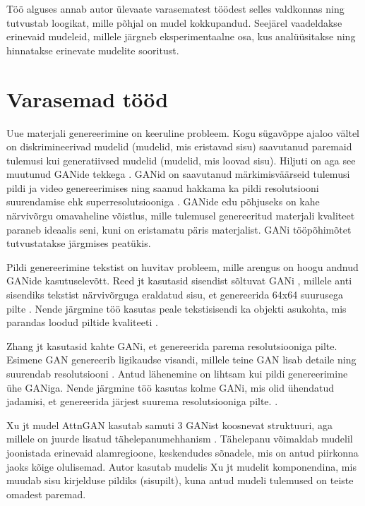 \documentclass{vilgym}
\begin{document}
	Töö alguses annab autor ülevaate varasematest töödest selles valdkonnas ning tutvustab loogikat, mille põhjal on mudel kokkupandud. Seejärel vaadeldakse erinevaid mudeleid, millele järgneb eksperimentaalne osa, kus analüüsitakse ning hinnatakse erinevate mudelite sooritust. 
	
	\section{Varasemad tööd}

	Uue materjali genereerimine on keeruline probleem. Kogu sügavõppe ajaloo vältel on diskrimineerivad mudelid (mudelid, mis eristavad sisu) saavutanud paremaid tulemusi kui generatiivsed mudelid (mudelid, mis loovad sisu). Hiljuti on aga see muutunud GANide tekkega \parencite{gan}. GANid on saavutanud märkimisväärseid tulemusi pildi \parencite{biggan} ja video genereerimises \parencite{dvdgan} ning saanud hakkama ka pildi resolutsiooni suurendamise ehk superresolutsiooniga \parencite{srgan}. GANide edu põhjuseks on kahe närvivõrgu omavaheline võistlus, mille tulemusel genereeritud materjali kvaliteet paraneb ideaalis seni, kuni on eristamatu päris materjalist. GANi tööpõhimõtet tutvustatakse järgmises peatükis.

	Pildi genereerimine tekstist on huvitav probleem, mille arengus on hoogu andnud GANide kasutuselevõtt. Reed jt kasutasid sisendist sõltuvat GANi , millele anti sisendiks tekstist närvivõrguga eraldatud sisu, et genereerida 64x64 suurusega pilte \parencite{reed}. Nende järgmine töö kasutas peale tekstisisendi ka objekti asukohta, mis parandas loodud piltide kvaliteeti \parencite{reed2}. 

	Zhang jt kasutasid kahte GANi, et genereerida parema resolutsiooniga pilte. Esimene GAN genereerib ligikaudse visandi, millele teine GAN lisab detaile ning suurendab resolutsiooni \parencite{stackgan}. Antud lähenemine on lihtsam kui pildi genereerimine ühe GANiga. Nende järgmine töö kasutas kolme GANi, mis olid ühendatud jadamisi, et genereerida järjest suurema resolutsiooniga pilte. \parencite{stackgan2}.

	Xu jt mudel AttnGAN kasutab samuti 3 GANist koosnevat struktuuri, aga millele on juurde lisatud tähelepanumehhanism \parencite{attngan}. Tähelepanu võimaldab mudelil joonistada erinevaid alamregioone, keskendudes sõnadele, mis on antud piirkonna jaoks kõige olulisemad. Autor kasutab mudelis Xu jt mudelit komponendina, mis muudab sisu kirjelduse pildiks (sisu\textrightarrow pilt), kuna antud mudeli tulemused on teiste omadest paremad. 
\end{document}
